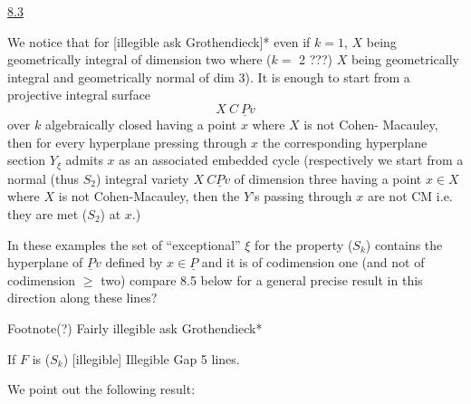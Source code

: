 
\uline{8.3}

We notice that for [illegible ask Grothendieck]* even if
$k = 1$, $X$ being geometrically integral of dimension two where ($k =$
2 ???) $X$ being geometrically integral and geometrically normal of
dim 3).  It is enough to start from a projective integral surface
\[ X \ C \ \underline{P}v \]
over $k$ algebraically closed having a point $x$ where $X$ is not Cohen-%
Macauley, then for every hyperplane pressing through $x$ the
corresponding hyperplane section $Y_{\xi}$ admits $x$ as an associated
embedded cycle (respectively we start from a normal (thus $S_2$)
integral variety $X \ C\underline{P}v$ of dimension three having a point $x \in X$
where $X$ is not Cohen-Macauley, then the $Y$'s passing through $x$ are
not CM i.e. they are met ($S_2$) at $x$.)

In these examples the set of ``exceptional'' $\xi$ for the property
($S_k$) contains the hyperplane of $\underline{P}v$ defined by $x \in \underline{P}$ and it is of
codimension one (and not of codimension $\geq$ two) compare 8.5 below
for a general precise result in this direction along these lines?

Footnote(?)  Fairly illegible ask Grothendieck*

If $F$ is ($S_k$) [illegible]
Illegible Gap  5 lines.

We point out the following result:


